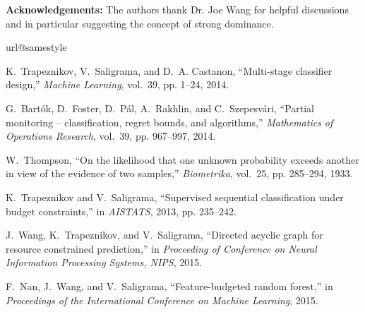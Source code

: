 \documentclass[11pt]{article} %
\begin{document}
\noindent
{\bf Acknowledgements:} The authors thank Dr. Joe Wang for helpful discussions and in particular suggesting the concept of strong dominance.
%
%
%
\begin{thebibliography}{10}
\providecommand{\url}[1]{#1}
\csname url@samestyle\endcsname
\providecommand{\newblock}{\relax}
\providecommand{\bibinfo}[2]{#2}
\providecommand{\BIBentrySTDinterwordspacing}{\spaceskip=0pt\relax}
\providecommand{\BIBentryALTinterwordstretchfactor}{4}
\providecommand{\BIBentryALTinterwordspacing}{\spaceskip=\fontdimen2\font plus
\BIBentryALTinterwordstretchfactor\fontdimen3\font minus
  \fontdimen4\font\relax}
\providecommand{\BIBforeignlanguage}[2]{{%
\expandafter\ifx\csname l@#1\endcsname\relax
\typeout{** WARNING: IEEEtran.bst: No hyphenation pattern has been}%
\typeout{** loaded for the language `#1'. Using the pattern for}%
\typeout{** the default language instead.}%
\else
\language=\csname l@#1\endcsname
\fi
#2}}
\providecommand{\BIBdecl}{\relax}
\BIBdecl

K.~Trapeznikov, V.~Saligrama, and D.~A. Castanon, ``Multi-stage classifier
  design,'' \emph{Machine Learning}, vol.~39, pp. 1--24, 2014.

G.~Bart{\'o}k, D.~Foster, D.~P{\'a}l, A.~Rakhlin, and C.~{Sz}epesv{\'a}ri,
  ``Partial monitoring -- classification, regret bounds, and algorithms,''
  \emph{Mathematics of Operations Research}, vol.~39, pp. 967--997, 2014.

W.~Thompson, ``On the likelihood that one unknown probability exceeds another
  in view of the evidence of two samples,'' \emph{Biometrika}, vol.~25, pp.
  285--294, 1933.

K.~Trapeznikov and V.~Saligrama, ``Supervised sequential classification under
  budget constraints,'' in \emph{AISTATS}, 2013, pp. 235--242.

J.~Wang, K.~Trapeznikov, and V.~Saligrama, ``Directed acyclic graph for
  resource constrained prediction,'' in \emph{Proceeding of Conference on
  Neural Information Processing Systems, NIPS}, 2015.

F.~Nan, J.~Wang, and V.~Saligrama, ``Feature-budgeted random forest,'' in
  \emph{Proceedings of the International Conference on Machine Learning}, 2015.


\end{thebibliography}
\end{document}
